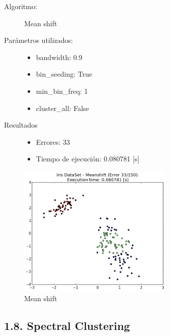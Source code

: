 \documentclass{article}
\begin{document}
\begin{description}
  \item[Algoritmo:] Mean shift
  \item[Parámetros utilizados:] \hfill
    \begin{itemize}
      \item bandwidth: 0.9
      \item bin\_seeding: True
      \item min\_bin\_freq: 1
      \item cluster\_all: False
    \end{itemize}
  \item[Resultados]\hfill
    \begin{itemize}
      \item Errores: 33
      \item Tiempo de ejecución: 0.080781 [s]
    \end{itemize}
\end{description}

\begin{figure}[H]
  \centering
  \includegraphics[width=0.666\textwidth]{img/Meanshift.png}
  \caption{Mean shift}
\end{figure}

\newpage




\subsection*{1.8. \; Spectral Clustering}
\end{document}
